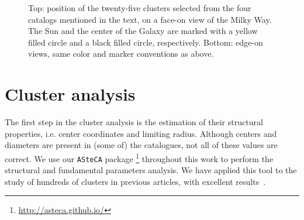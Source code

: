 \documentclass{aa}
\begin{document}
 \begin{figure}
  \caption{Top: position of the twenty-five clusters selected from the four
  catalogs mentioned in the text, on a face-on view of the Milky Way. The Sun
  and the center of the Galaxy are marked with a yellow filled circle and a
  black filled circle, respectively. Bottom: edge-on views, same color and
  marker conventions as above.}
  \label{fig:MWmap}
 \end{figure}





\section{Cluster analysis}
 \label{sec:clust_analy}

 The first step in the cluster analysis is the estimation of their structural
 properties, i.e. center coordinates and limiting radius. Although centers and
 diameters are present in (some of) the catalogues, not all of these values are
 correct. We use our \texttt{ASteCA} package
 \citep{Perren_2015}\footnote{\url{http://asteca.github.io/}} throughout this
 work to perform the structural and fundamental parameters analysis. We have
 applied this tool to the study of hundreds of clusters in previous articles,
 with excellent results~\citep{Perren_2017,Perren_2020}.
\end{document}
